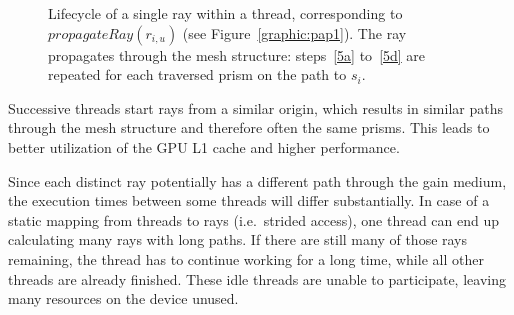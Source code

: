 \begin{figure}[H]
  \centerline
  {}
  \caption{Lifecycle of a single ray within a thread, corresponding to
    $propagateRay(r_{i,u})$ (see Figure~\ref{graphic:pap1}). The ray
    propagates through the mesh structure: steps~\ref{5a} to~\ref{5d}
    are repeated for each traversed prism on the path to $s_i$.}

  \label{graphic:algorithm_steps}
\end{figure}
Successive threads start rays from a similar origin, which results
in similar paths through the mesh structure and therefore often the same prisms. This
leads to better utilization of the GPU L1 cache and higher performance.

Since each distinct ray potentially has a different path through the gain
medium, the execution times between some threads will differ substantially. In case
of a static mapping from threads to rays (i.e.\ strided access), one thread can
end up calculating many rays with long paths. If there are still many of those
rays remaining, the thread has to continue working for a long time, while all
other threads are already finished. These idle threads are unable to
participate, leaving many resources on the device unused.

